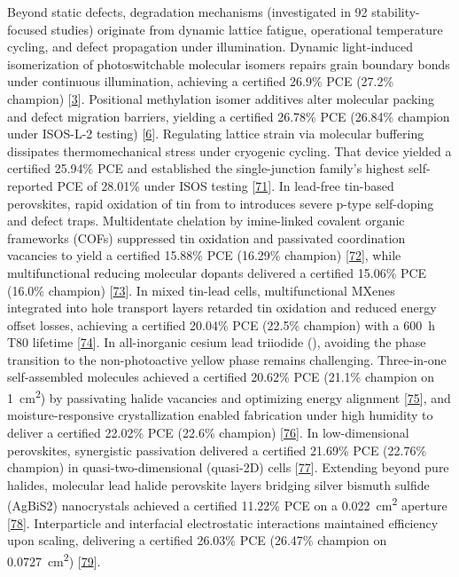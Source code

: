 \documentclass[
  11pt,
]{article}
\begin{document}
Beyond static defects, degradation mechanisms (investigated in 92
stability-focused studies) originate from dynamic lattice fatigue,
operational temperature cycling, and defect propagation under
illumination. Dynamic light-induced isomerization of photoswitchable
molecular isomers repairs grain boundary bonds under continuous
illumination, achieving a certified 26.9\% PCE (27.2\% champion)
{[}\href{https://doi.org/10.1038/s41560-026-01993-z}{3}{]}. Positional
methylation isomer additives alter molecular packing and defect
migration barriers, yielding a certified 26.78\% PCE (26.84\% champion
under ISOS-L-2 testing)
{[}\href{https://doi.org/10.1002/adma.202520432}{6}{]}. Regulating
lattice strain via molecular buffering dissipates thermomechanical
stress under cryogenic cycling. That device yielded a certified 25.94\%
PCE and established the single-junction family's highest self-reported
PCE of 28.01\% under ISOS testing
{[}\href{https://doi.org/10.1002/adma.202519339}{71}{]}. In lead-free
tin-based perovskites, rapid oxidation of tin from  to
 introduces severe p-type self-doping and defect traps.
Multidentate chelation by imine-linked covalent organic frameworks
(COFs) suppressed tin oxidation and passivated coordination vacancies to
yield a certified 15.88\% PCE (16.29\% champion)
{[}\href{https://doi.org/10.1002/adma.202519934}{72}{]}, while
multifunctional reducing molecular dopants delivered a certified 15.06\%
PCE (16.0\% champion)
{[}\href{https://doi.org/10.1002/rar2.70162}{73}{]}. In mixed tin-lead
cells, multifunctional MXenes integrated into  hole transport
layers retarded tin oxidation and reduced energy offset losses,
achieving a certified 20.04\% PCE (22.5\% champion) with a
\qty{600}{\hour} T80 lifetime
{[}\href{https://doi.org/10.1002/adfm.202521919}{74}{]}. In
all-inorganic cesium lead triiodide (), avoiding the phase
transition to the non-photoactive yellow phase remains challenging.
Three-in-one self-assembled molecules achieved a certified 20.62\% PCE
(21.1\% champion on \qty{1}{\centi\meter\squared}) by passivating halide
vacancies and optimizing energy alignment
{[}\href{https://doi.org/10.1021/acsenergylett.6c00820}{75}{]}, and
moisture-responsive crystallization enabled  fabrication
under high humidity to deliver a certified 22.02\% PCE (22.6\% champion)
{[}\href{https://doi.org/10.1038/s41467-026-69687-4}{76}{]}. In
low-dimensional perovskites, synergistic passivation delivered a
certified 21.69\% PCE (22.76\% champion) in quasi-two-dimensional
(quasi-2D) cells {[}\href{https://doi.org/10.1002/adma.72756}{77}{]}.
Extending beyond pure halides, molecular lead halide perovskite layers
bridging silver bismuth sulfide (AgBiS2) nanocrystals achieved a
certified 11.22\% PCE on a \qty{0.022}{\centi\meter\squared} aperture
{[}\href{https://doi.org/10.1038/s41467-026-72272-4}{78}{]}.
Interparticle and interfacial electrostatic interactions maintained
efficiency upon scaling, delivering a certified 26.03\% PCE (26.47\%
champion on \qty{0.0727}{\centi\meter\squared})
{[}\href{https://doi.org/10.1021/acsenergylett.6c00476}{79}{]}.
\end{document}
